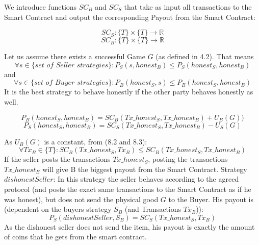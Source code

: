 \documentclass{cacthesis}
\begin{document}
We introduce functions $SC_B$ and $SC_S$ that take as input all transactions to the Smart Contract and output the corresponding Payout from the Smart Contract:

\[ SC_S : \{T\} \times \{T\} \to \mathbb{R} \]
\[ SC_B : \{T\} \times \{T\} \to \mathbb{R} \]

Let us assume there exists a successful Game $G$ (as defined in 4.2). That means
\begin{equation}
    \forall s \in \{\textit{set of Seller strategies}\}: P_S(s, honest_B) \leq P_S(honest_S,honest_B)
\end{equation}
and
\begin{equation}
    \forall s \in \{\textit{set of Buyer strategies}\}: P_B(honest_S, s) \leq P_B(honest_S,honest_B)
\end{equation}
It is the best strategy to behave honestly if the other party behaves honestly as well.\newline


\begin{equation}
    P_B(honest_S,honest_B) = SC_B(Tx\_honest_S, Tx\_honest_B) + U_B(G))
\end{equation} 
\begin{equation}
    P_S(honest_S,honest_B) = SC_S(Tx\_honest_S, Tx\_honest_B) - U_S(G) 
\end{equation}

As $U_B(G)$ is a constant, from (8.2 and 8.3):
\begin{equation}
    \forall Tx_B \in \{T\}: SC_B(Tx\_honest_S, Tx_B) \leq SC_B(Tx\_honest_S, Tx\_honest_B)
\end{equation}
If the seller posts the transactions $Tx\_honest_S$, posting the transactions $Tx\_honest_B$ will give B the biggest payout from the Smart Contract.
Strategy $dishonestSeller$: In this strategy the seller behaves according to the agreed protocol (and posts the exact same transactions to the Smart Contract as if he was honest), but does not send the physical good $G$ to the Buyer.\newline
His payout is (dependent on the buyers strategy $S_B$ (and Transactions $Tx_B$)):
\begin{equation}
    P_S(dishonestSeller,S_B) = SC_S(Tx\_honest_S,Tx_B)
\end{equation}
As the dishonest seller does not send the item, his payout is exactly the amount of coins that he gets from the smart contract.\newline
\end{document}
